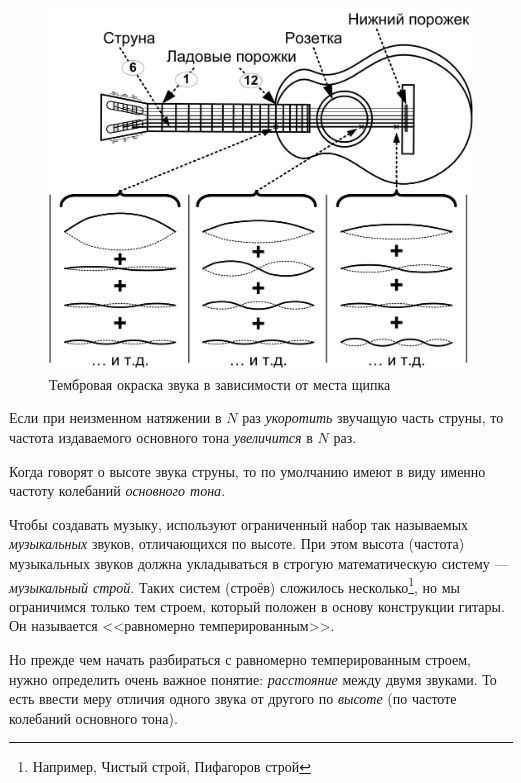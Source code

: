 \begin{Example}
    \begin{figure}[!ht]
        \centering
        \includegraphics{fig/obertone-color} 
        \caption{Тембровая окраска звука в зависимости от места щипка}\label{fig:music:tone:obertone-color}
    \end{figure} 
\end{Example}


\begin{Definition}
    Если при неизменном натяжении в $N$ раз \emph{укоротить} звучащую часть струны, то частота издаваемого основного тона \emph{увеличится} в $N$ раз.
\end{Definition}

Когда говорят о высоте звука струны, то по умолчанию имеют в виду именно частоту колебаний \emph{основного тона}.

Чтобы создавать музыку, используют ограниченный набор так называемых \emph{музыкальных} звуков, отличающихся по высоте. При этом высота (частота) музыкальных звуков должна укладываться в строгую математическую систему --- \emph{музыкальный строй}. Таких систем (строёв) сложилось несколько\footnote{Например, Чистый строй, Пифагоров строй}, но мы ограничимся только тем строем, который положен в основу конструкции гитары. Он называется <<равномерно темперированным>>.

Но прежде чем начать разбираться с равномерно темперированным строем, нужно определить очень важное понятие: \emph{расстояние} между двумя звуками. То есть ввести меру отличия одного звука от другого по \emph{высоте} (по частоте колебаний основного тона). 

